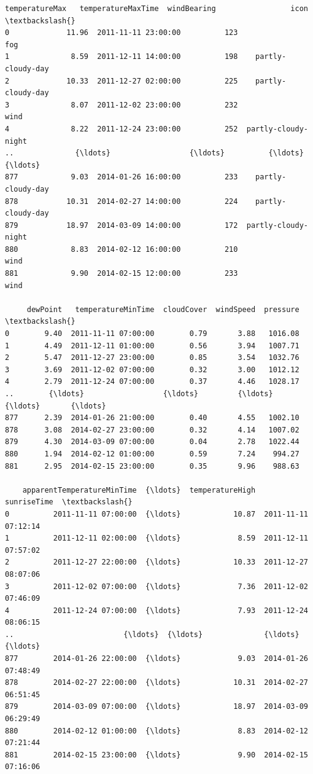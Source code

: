 \documentclass[11pt]{article}
\makeatletter
\newcommand{\boxspacing}{\kern\kvtcb@left@rule\kern\kvtcb@boxsep}
\newcommand{\prompt}[4]{
        {\ttfamily\llap{{\color{#2}[#3]:\hspace{3pt}#4}}\vspace{-\baselineskip}}
    }
\makeatother
\begin{document}
            \begin{tcolorbox}[breakable, size=fbox, boxrule=.5pt, pad at break*=1mm, opacityfill=0]
\prompt{Out}{outcolor}{92}{\boxspacing}
\begin{Verbatim}[commandchars=\\\{\}]
     temperatureMax   temperatureMaxTime  windBearing                 icon  \textbackslash{}
0             11.96  2011-11-11 23:00:00          123                  fog
1              8.59  2011-12-11 14:00:00          198    partly-cloudy-day
2             10.33  2011-12-27 02:00:00          225    partly-cloudy-day
3              8.07  2011-12-02 23:00:00          232                 wind
4              8.22  2011-12-24 23:00:00          252  partly-cloudy-night
..              {\ldots}                  {\ldots}          {\ldots}                  {\ldots}
877            9.03  2014-01-26 16:00:00          233    partly-cloudy-day
878           10.31  2014-02-27 14:00:00          224    partly-cloudy-day
879           18.97  2014-03-09 14:00:00          172  partly-cloudy-night
880            8.83  2014-02-12 16:00:00          210                 wind
881            9.90  2014-02-15 12:00:00          233                 wind

     dewPoint   temperatureMinTime  cloudCover  windSpeed  pressure  \textbackslash{}
0        9.40  2011-11-11 07:00:00        0.79       3.88   1016.08
1        4.49  2011-12-11 01:00:00        0.56       3.94   1007.71
2        5.47  2011-12-27 23:00:00        0.85       3.54   1032.76
3        3.69  2011-12-02 07:00:00        0.32       3.00   1012.12
4        2.79  2011-12-24 07:00:00        0.37       4.46   1028.17
..        {\ldots}                  {\ldots}         {\ldots}        {\ldots}       {\ldots}
877      2.39  2014-01-26 21:00:00        0.40       4.55   1002.10
878      3.08  2014-02-27 23:00:00        0.32       4.14   1007.02
879      4.30  2014-03-09 07:00:00        0.04       2.78   1022.44
880      1.94  2014-02-12 01:00:00        0.59       7.24    994.27
881      2.95  2014-02-15 23:00:00        0.35       9.96    988.63

    apparentTemperatureMinTime  {\ldots}  temperatureHigh          sunriseTime  \textbackslash{}
0          2011-11-11 07:00:00  {\ldots}            10.87  2011-11-11 07:12:14
1          2011-12-11 02:00:00  {\ldots}             8.59  2011-12-11 07:57:02
2          2011-12-27 22:00:00  {\ldots}            10.33  2011-12-27 08:07:06
3          2011-12-02 07:00:00  {\ldots}             7.36  2011-12-02 07:46:09
4          2011-12-24 07:00:00  {\ldots}             7.93  2011-12-24 08:06:15
..                         {\ldots}  {\ldots}              {\ldots}                  {\ldots}
877        2014-01-26 22:00:00  {\ldots}             9.03  2014-01-26 07:48:49
878        2014-02-27 22:00:00  {\ldots}            10.31  2014-02-27 06:51:45
879        2014-03-09 07:00:00  {\ldots}            18.97  2014-03-09 06:29:49
880        2014-02-12 01:00:00  {\ldots}             8.83  2014-02-12 07:21:44
881        2014-02-15 23:00:00  {\ldots}             9.90  2014-02-15 07:16:06


\end{Verbatim}
\end{tcolorbox}
\end{document}

